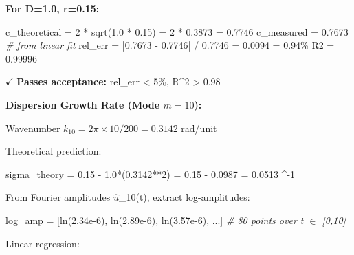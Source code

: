 \documentclass[
]{article}
\newenvironment{Shaded}{}{}
\newcommand{\CommentTok}[1]{\textcolor[rgb]{0.38,0.63,0.69}{\textit{#1}}}
\newcommand{\DecValTok}[1]{\textcolor[rgb]{0.25,0.63,0.44}{#1}}
\newcommand{\FloatTok}[1]{\textcolor[rgb]{0.25,0.63,0.44}{#1}}
\newcommand{\NormalTok}[1]{#1}
\newcommand{\OperatorTok}[1]{\textcolor[rgb]{0.40,0.40,0.40}{#1}}
\begin{document}
\textbf{For D=1.0, r=0.15:}

\begin{Shaded}
\begin{Highlighting}[]
\NormalTok{c\_theoretical }\OperatorTok{=} \DecValTok{2} \OperatorTok{*}\NormalTok{ sqrt(}\FloatTok{1.0} \OperatorTok{*} \FloatTok{0.15}\NormalTok{) }\OperatorTok{=} \DecValTok{2} \OperatorTok{*} \FloatTok{0.3873} \OperatorTok{=} \FloatTok{0.7746}
\NormalTok{c\_measured }\OperatorTok{=} \FloatTok{0.7673}  \CommentTok{\# from linear fit}
\NormalTok{rel\_err }\OperatorTok{=} \OperatorTok{|}\FloatTok{0.7673} \OperatorTok{{-}} \FloatTok{0.7746}\OperatorTok{|} \OperatorTok{/} \FloatTok{0.7746} \OperatorTok{=} \FloatTok{0.0094} \OperatorTok{=} \FloatTok{0.94}\OperatorTok{\%}
\NormalTok{R2 }\OperatorTok{=} \FloatTok{0.99996}
\end{Highlighting}
\end{Shaded}

$\checkmark$ \textbf{Passes acceptance:} rel\_err \textless{} 5\%, R^{2}
\textgreater{} 0.98

\textbf{Dispersion Growth Rate (Mode \(m=10\)):}

Wavenumber \(k_{10} = 2\pi\times 10/200 = 0.3142\) rad/unit

Theoretical prediction:

\begin{Shaded}
\begin{Highlighting}[]
\NormalTok{sigma\_theory }\OperatorTok{=} \FloatTok{0.15} \OperatorTok{{-}} \FloatTok{1.0}\OperatorTok{*}\NormalTok{(}\FloatTok{0.3142}\OperatorTok{**}\DecValTok{2}\NormalTok{) }\OperatorTok{=} \FloatTok{0.15} \OperatorTok{{-}} \FloatTok{0.0987} \OperatorTok{=} \FloatTok{0.0513}\NormalTok{ ^{-1}}
\end{Highlighting}
\end{Shaded}

From Fourier amplitudes \textbar $\hat{u}$\_10(t)\textbar, extract
log-amplitudes:

\begin{Shaded}
\begin{Highlighting}[]
\NormalTok{log\_amp }\OperatorTok{=}\NormalTok{ [ln(}\FloatTok{2.34e{-}6}\NormalTok{), ln(}\FloatTok{2.89e{-}6}\NormalTok{), ln(}\FloatTok{3.57e{-}6}\NormalTok{), ...]  }\CommentTok{\# 80 points over t $\in$ [0,10]}
\end{Highlighting}
\end{Shaded}

Linear regression:
\end{document}
